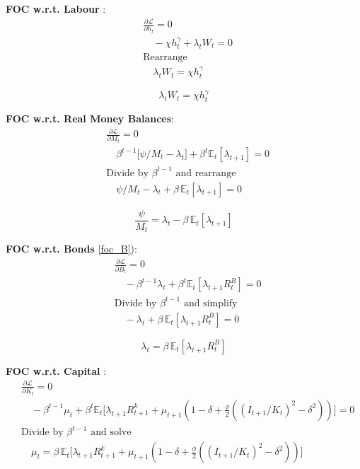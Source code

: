 \documentclass[11pt,preprint]{elsarticle}
\numberwithin{equation}{section}
\numberwithin{figure}{section}
\numberwithin{table}{section}
\begin{document}
\textbf{FOC w.r.t. Labour} : \begin{align*}
  & \frac{\partial \mathcal{L}}{\partial h_t} = 0 \\
  & \quad -\chi h_t^{\gamma} + \lambda_t W_t = 0 \\[6pt]
  & \text{Rearrange} \\
  & \quad \lambda_t W_t = \chi h_t^{\gamma}
\end{align*}

\begin{equation}\label{foc_h}
\boxed{\lambda_t W_t = \chi h_t^{\gamma}}
\end{equation}

\textbf{FOC w.r.t. Real Money Balances}: \begin{align*}
  & \frac{\partial \mathcal{L}}{\partial M_t} = 0 \\
  & \quad \beta^{t-1}\bigl[\psi/M_t - \lambda_t\bigr] + \beta^t\mathbb{E}_t[\lambda_{t+1}] = 0 \\[6pt]
  & \text{Divide by }\beta^{t-1}\text{ and rearrange} \\
  & \quad \psi/M_t - \lambda_t + \beta\,\mathbb{E}_t[\lambda_{t+1}] = 0
\end{align*}

\begin{equation}\label{foc_M}
\boxed{\frac{\psi}{M_t} = \lambda_t - \beta\,\mathbb{E}_t[\lambda_{t+1}]}
\end{equation}

\textbf{FOC w.r.t. Bonds} \eqref{foc_B}): \begin{align*}
  & \frac{\partial \mathcal{L}}{\partial B_t} = 0 \\
  & \quad -\beta^{t-1}\lambda_t + \beta^t\mathbb{E}_t[\lambda_{t+1}R^B_t] = 0 \\[6pt]
  & \text{Divide by }\beta^{t-1}\text{ and simplify} \\
  & \quad -\lambda_t + \beta\,\mathbb{E}_t[\lambda_{t+1}R^B_t] = 0
\end{align*}

\begin{equation}\label{foc_B}
\boxed{\lambda_t = \beta\,\mathbb{E}_t[\lambda_{t+1}R^B_t]}
\end{equation}

\textbf{FOC w.r.t. Capital} : \begin{align*}
  & \frac{\partial \mathcal{L}}{\partial K_t} = 0 \\
  & \quad -\beta^{t-1}\mu_t + \beta^t\mathbb{E}_t\bigl[\lambda_{t+1}R^k_{t+1} + \mu_{t+1}(1-\delta + \tfrac{\phi}{2}((I_{t+1}/K_t)^2 - \delta^2))\bigr] = 0 \\[6pt]
  & \text{Divide by }\beta^{t-1}\text{ and solve} \\
  & \quad \mu_t = \beta\,\mathbb{E}_t\bigl[\lambda_{t+1}R^k_{t+1} + \mu_{t+1}(1-\delta + \tfrac{\phi}{2}((I_{t+1}/K_t)^2 - \delta^2))\bigr]
\end{align*}
\end{document}
